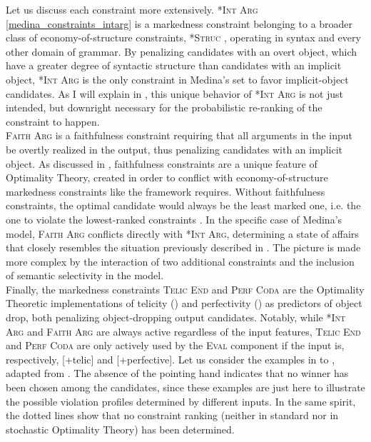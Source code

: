 Let us discuss each constraint more extensively. \textsc{*Int Arg} \ref{medina_constraints_intarg} is a markedness constraint belonging to a broader class of economy-of-structure constraints, \textsc{*Struc} \parencite{buchwald2002recoverability, hartkemeyer2000ot}, operating in syntax and every other domain of grammar. By penalizing candidates with an overt object, which have a greater degree of syntactic structure than candidates with an implicit object, \textsc{*Int Arg} is the only constraint in Medina's set to favor implicit-object candidates. As I will explain in , this unique behavior of \textsc{*Int Arg} is not just intended, but downright necessary for the probabilistic re-ranking of the constraint to happen.\\
\textsc{Faith Arg} is a faithfulness constraint requiring that all arguments in the input be overtly realized in the output, thus penalizing candidates with an implicit object. As discussed in , faithfulness constraints are a unique feature of Optimality Theory, created in order to conflict with economy-of-structure markedness constraints like the framework requires. Without faithfulness constraints, the optimal candidate would always be the least marked one, i.e. the one to violate the lowest-ranked constraints \parencite[3]{legendre2001introduction}. In the specific case of Medina's model, \textsc{Faith Arg} conflicts directly with \textsc{*Int Arg}, determining a state of affairs that closely resembles the situation previously described in . The picture is made more complex by the interaction of two additional constraints and the inclusion of semantic selectivity in the model.\\
Finally, the markedness constraints \textsc{Telic End} and \textsc{Perf Coda} are the Optimality Theoretic implementations of telicity () and perfectivity () as predictors of object drop, both penalizing object-dropping output candidates. Notably, while \textsc{*Int Arg} and \textsc{Faith Arg} are always active regardless of the input features, \textsc{Telic End} and \textsc{Perf Coda} are only actively used by the \textsc{Eval} component if the input is, respectively, [+telic] and [+perfective]. Let us consider the examples in  to , adapted from \textcite{Medina2007}. The absence of the pointing hand indicates that no winner has been chosen among the candidates, since these examples are just here to illustrate the possible violation profiles determined by different inputs. In the same spirit, the dotted lines show that no constraint ranking (neither in standard nor in stochastic Optimality Theory) has been determined.\\
